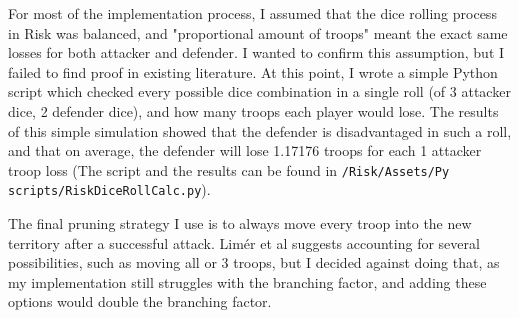 For most of the implementation process, I assumed that the dice rolling process in Risk was balanced, and "proportional amount of troops" meant the exact same losses for both attacker and defender. I wanted to confirm this assumption, but I failed to find proof in existing literature. At this point, I wrote a simple Python script which checked every possible dice combination in a single roll (of 3 attacker dice, 2 defender dice), and how many troops each player would lose. The results of this simple simulation showed that the defender is disadvantaged in such a roll, and that on average, the defender will lose 1.17176 troops for each 1 attacker troop loss (The script and the results can be found in \texttt{/Risk/Assets/Py scripts/RiskDiceRollCalc.py}).

The final pruning strategy I use is to always move every troop into the new territory after a successful attack. Lim{\'e}r et al\cite{limer2020monte} suggests accounting for several possibilities, such as moving all or 3 troops, but I decided against doing that, as my implementation still struggles with the branching factor, and adding these options would double the branching factor.